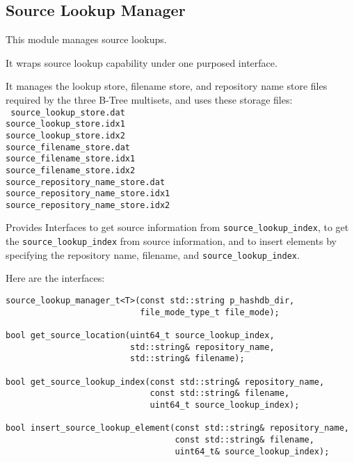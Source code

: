 \documentclass[12pt,twoside]{article}
\begin{document}
\subsection{Source Lookup Manager}
This module manages source lookups.
\begin{compactitem}
\item It wraps source lookup capability under one purposed interface.
\item It manages the lookup store, filename store,
and repository name store files required by the three B-Tree multisets,
and uses these storage files: \\
\texttt{
source\_lookup\_store.dat \\
source\_lookup\_store.idx1 \\
source\_lookup\_store.idx2 \\
source\_filename\_store.dat \\
source\_filename\_store.idx1 \\
source\_filename\_store.idx2 \\
source\_repository\_name\_store.dat \\
source\_repository\_name\_store.idx1 \\
source\_repository\_name\_store.idx2
}
\item Provides Interfaces to get source information
from \texttt{source\_lookup\_index},
to get the \texttt{source\_lookup\_index} from source information,
and to insert elements by specifying the repository name, filename,
and \texttt{source\_lookup\_index}.
\end{compactitem}

Here are the interfaces:

\begin{small}
\begin{verbatim}
source_lookup_manager_t<T>(const std::string p_hashdb_dir,
                           file_mode_type_t file_mode);

bool get_source_location(uint64_t source_lookup_index,
                         std::string& repository_name,
                         std::string& filename);

bool get_source_lookup_index(const std::string& repository_name,
                             const std::string& filename,
                             uint64_t source_lookup_index);

bool insert_source_lookup_element(const std::string& repository_name,
                                  const std::string& filename,
                                  uint64_t& source_lookup_index);
\end{verbatim}
\end{small}
\end{document}
